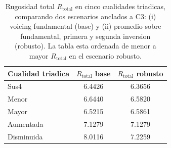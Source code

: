 \begin{table}[H]
\centering
\caption[Orden de rugosidad triadica (anclado)]{Rugosidad total $R_{\text{total}}$ en cinco cualidades triadicas, comparando dos escenarios anclados a C3: (i) voicing fundamental (base) y (ii) promedio sobre fundamental, primera y segunda inversion (robusto). La tabla esta ordenada de menor a mayor $R_{\text{total}}$ en el escenario robusto.}
\label{tab:orden_triadas_rtotal_anclado}
\small
\begin{tabular}{l c c}
\toprule
\textbf{Cualidad triadica} & \textbf{$R_{\text{total}}$ base} & \textbf{$R_{\text{total}}$ robusto} \\
\midrule
Sus4 & 6.4426 & 6.3656 \\
Menor & 6.6440 & 6.5820 \\
Mayor & 6.5215 & 6.5861 \\
Aumentada & 7.1279 & 7.1279 \\
Disminuida & 8.0116 & 7.2259 \\
\bottomrule
\end{tabular}
\end{table}
